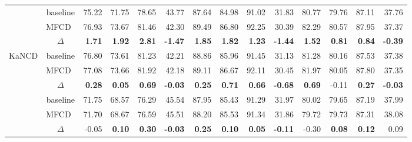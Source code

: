 \documentclass[a4paper,runningheads]{llncs}
\def\mymethod{MFCD}
\newcommand{\redbf}[1]{\textcolor{myred}{\textbf{#1}}} %
\newcommand{\green}[1]{\textcolor{mygreen}{#1}}       %
\begin{document}
\begin{table}[!t]
{\begin{tabular}{cc|rrrr|rrrr|rrrr}
\rowcolor{mybgc} & baseline & 75.22 & 71.75 & 78.65 & 43.77 & 87.64 & 84.98 & 91.02 & 31.83 & 80.77 & 79.76 & 87.11 & 37.76 \\
\rowcolor{mybgc}                      & \mymethod\ & 76.93 & 73.67 & 81.46 & 42.30 & 89.49 & 86.80 & 92.25 & 30.39 & 82.29 & 80.57 & 87.95 & 37.37 \\
\rowcolor{mybgc} \multirow{-3}{*}{NCDM}& $\Delta$& \redbf{1.71} & \redbf{1.92} & \redbf{2.81} & \redbf{-1.47} & \redbf{1.85} & \redbf{1.82} & \redbf{1.23} & \redbf{-1.44} & \redbf{1.52} & \redbf{0.81} & \redbf{0.84} & \redbf{-0.39}  \\
\multirow{3}{*}{KaNCD} & baseline & 76.80 & 73.61 & 81.23 & 42.21 & 88.86 & 85.96 & 91.45 & 31.13 & 81.28 & 80.16 & 87.53 & 37.38 \\
                       & \mymethod\ & 77.08 & 73.66 & 81.92 & 42.18 & 89.11 & 86.67 & 92.11 & 30.45 & 81.97 & 80.05 & 87.80 & 37.35 \\
                       & $\Delta$ & \redbf{0.28} & \redbf{0.05} & \redbf{0.69} & \redbf{-0.03} & \redbf{0.25} & \redbf{0.71} & \redbf{0.66} & \redbf{-0.68} & \redbf{0.69} & \green{-0.11} & \redbf{0.27} & \redbf{-0.03}\\
\rowcolor{mybgc}& baseline & 71.75 & 68.57 & 76.29 & 45.54 & 87.95 & 85.43 & 91.29 & 31.97 & 80.02 & 79.65 & 87.19 & 37.99 \\
\rowcolor{mybgc} & \mymethod\ & 71.70 & 68.67 & 76.59 & 45.51 & 88.20 & 85.53 & 91.34 & 31.86 & 79.72 & 79.73 & 87.31 & 38.08 \\
\rowcolor{mybgc}\multirow{-3}{*}{FairWISA} & $\Delta$ & \green{-0.05} & \redbf{0.10} & \redbf{0.30} & \redbf{-0.03} & \redbf{0.25} & \redbf{0.10} & \redbf{0.05} & \redbf{-0.11} & \green{-0.30} & \redbf{0.08} & \redbf{0.12} & \green{0.09} \\


\end{tabular}}
\end{table}
\end{document}
